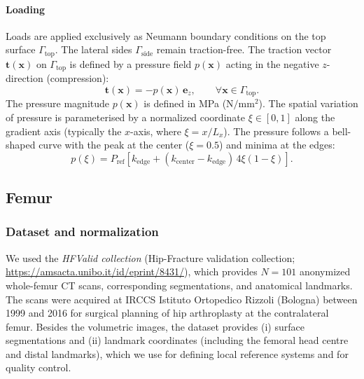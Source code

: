 \paragraph{Loading}
Loads are applied exclusively as Neumann boundary conditions on the top surface $\Gamma_{\mathrm{top}}$. The lateral sides $\Gamma_{\mathrm{side}}$ remain traction-free.
The traction vector $\mathbf{t}(\mathbf{x})$ on $\Gamma_{\mathrm{top}}$ is defined by a pressure field $p(\mathbf{x})$ acting in the negative $z$-direction (compression):
\begin{equation}
\mathbf{t}(\mathbf{x}) = -p(\mathbf{x})\,\mathbf{e}_z, \qquad \forall \mathbf{x} \in \Gamma_{\mathrm{top}}.
\end{equation}
The pressure magnitude $p(\mathbf{x})$ is defined in MPa ($\mathrm{N/mm^2}$). The spatial variation of pressure is parameterised by a normalized coordinate $\xi \in [0, 1]$ along the gradient axis (typically the $x$-axis, where $\xi = x/L_x$). The pressure follows a bell-shaped curve with the peak at the center ($\xi=0.5$) and minima at the edges:
\begin{equation}
p(\xi) = P_{\mathrm{ref}} \left[ k_{\mathrm{edge}} + (k_{\mathrm{center}} - k_{\mathrm{edge}})\, 4\xi(1-\xi) \right].
\end{equation}
\subsection*{Femur}
\subsubsection*{Dataset and normalization}
We used the \emph{HFValid collection} \cite{Aldieri2025_HFValidCollection} (Hip-Fracture validation collection; \url{https://amsacta.unibo.it/id/eprint/8431/}), which provides $N=101$ anonymized whole-femur CT scans, corresponding segmentations, and anatomical landmarks.
 The scans were acquired at IRCCS Istituto Ortopedico Rizzoli (Bologna) between 1999 and 2016 for surgical planning of hip arthroplasty at the contralateral femur. Besides the volumetric images, the dataset provides (i) surface segmentations and (ii) landmark coordinates (including the femoral head centre and distal landmarks), which we use for defining local reference systems and for quality control.

